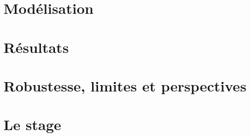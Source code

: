 \documentclass[12pt,a4paper]{report}
\begin{document}
\part{Modélisation}
\label{part:modele}

\part{Résultats}
\label{part:resultats}

\part{Robustesse, limites et perspectives}
\label{part:limites}

\part{Le stage}
\label{part:stage}
\end{document}
